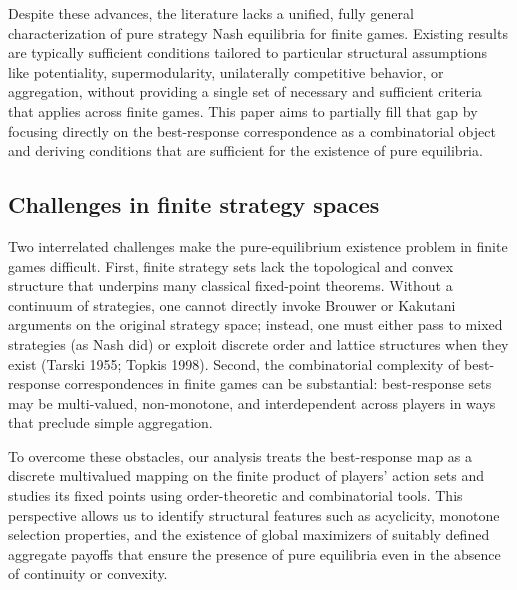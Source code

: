 \documentclass[11pt]{article}
\begin{document}
Despite these advances, the literature lacks a unified, fully general characterization of pure strategy Nash equilibria for finite games. Existing results are typically sufficient conditions tailored to particular structural assumptions like potentiality, supermodularity, unilaterally competitive behavior, or aggregation, without providing a single set of necessary and sufficient criteria that applies across finite games. This paper aims to partially fill that gap by focusing directly on the best-response correspondence as a combinatorial object and deriving conditions that are sufficient for the existence of pure equilibria.

\subsection{Challenges in finite strategy spaces}
Two interrelated challenges make the pure-equilibrium existence problem in finite games difficult. First, finite strategy sets lack the topological and convex structure that underpins many classical fixed-point theorems. Without a continuum of strategies, one cannot directly invoke Brouwer or Kakutani arguments on the original strategy space; instead, one must either pass to mixed strategies (as Nash did) or exploit discrete order and lattice structures when they exist (Tarski 1955; Topkis 1998). Second, the combinatorial complexity of best-response correspondences in finite games can be substantial: best-response sets may be multi-valued, non-monotone, and interdependent across players in ways that preclude simple aggregation.

To overcome these obstacles, our analysis treats the best-response map as a discrete multivalued mapping on the finite product of players' action sets and studies its fixed points using order-theoretic and combinatorial tools. This perspective allows us to identify structural features such as acyclicity, monotone selection properties, and the existence of global maximizers of suitably defined aggregate payoffs that ensure the presence of pure equilibria even in the absence of continuity or convexity.
\end{document}
